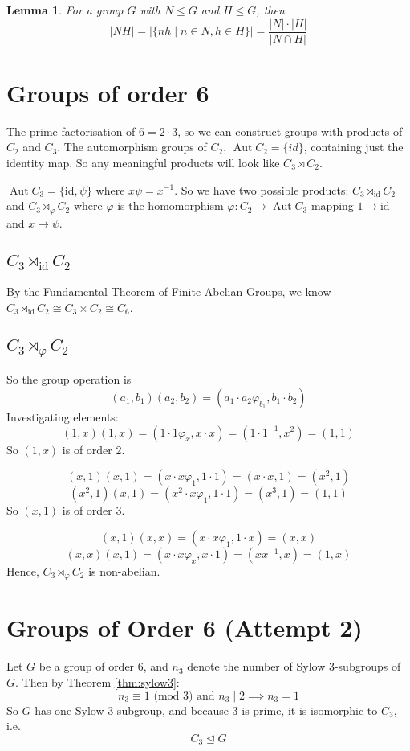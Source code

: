 \documentclass[a4paper, oneside, 12pt, final]{article}
\newtheorem{lemma}[theorem]{Lemma}
\theoremstyle{definition}
\DeclareMathOperator{\Aut}{Aut}
\begin{document}
\begin{lemma}
\label{lem:setprodorder}
    For a group \(G\) with \(N \leqslant G\) and \(H \leqslant G\), then
    \[|NH| = |\{nh \mid n \in N, h \in H\}| = \frac{|N| \cdot |H|}{|N \cap H|}\]
\end{lemma}

\section{Groups of order 6}
The prime factorisation of \(6 = 2 \cdot 3\), so we can construct groups with
products of \(C_2\) and \(C_3\). The automorphism groups of \(C_2\),
\(\Aut{C_2} = \{id\}\), containing just the identity map. So any meaningful
products will look like \(C_3 \rtimes C_2\).

\(\Aut{C_3} = \{\text{id}, \psi\}\) where \(x\psi = x^{-1}\).
So we have two possible products: \(C_3 {\rtimes}_{\text{id}} C_2\) and \(C_3
{\rtimes}_{\varphi} C_2\) where \(\varphi\) is the homomorphism \(\varphi:C_2
\to \Aut{C_3}\) mapping \(1 \mapsto \text{id}\) and \(x \mapsto \psi\).

\subsection{\(C_3 \rtimes_\text{id} C_2\)}
By the Fundamental Theorem of Finite Abelian Groups, we know \( C_3
\rtimes_\text{id} C_2 \cong C_3 \times C_2 \cong C_6\).

\subsection{\(C_3 \rtimes_\varphi C_2\)}
So the group operation is
\[(a_1, b_1)(a_2, b_2) = (a_1\cdot a_2\varphi_{b_1}, b_1\cdot b_2)\]
Investigating elements:
\[(1,x)(1,x) = (1 \cdot 1\varphi_x, x \cdot x) = (1 \cdot 1^{-1}, x^2) = (1,
1)\]
So \((1, x)\) is of order 2.

\[(x, 1)(x, 1) = (x \cdot x\varphi_1, 1 \cdot 1) = (x \cdot x, 1) = (x^2, 1)\]
\[(x^2, 1)(x, 1) = (x^2 \cdot x\varphi_1, 1 \cdot 1) = (x^3, 1) = (1, 1)\]
So \((x, 1)\) is of order 3.

\[(x, 1)(x, x) = (x \cdot x\varphi_1, 1 \cdot x) = (x, x)\]
\[(x, x)(x, 1) = (x \cdot x\varphi_x, x \cdot 1) = (xx^{-1}, x) = (1, x)\]
Hence, \(C_3 \rtimes_\varphi C_2\) is non-abelian.

\section{Groups of Order 6 (Attempt 2)}
Let $G$ be a group of order 6, and $n_3$ denote the number of Sylow 3-subgroups
of $G$.
Then by Theorem \ref{thm:sylow3}:
\[n_3 \equiv 1 \text{ (mod 3) and } n_3 \mid 2 \implies n_3 = 1\]
So $G$ has one Sylow 3-subgroup, and because 3 is prime, it is isomorphic to
$C_3$, i.e.
\[C_3 \unlhd G\]
\end{document}
